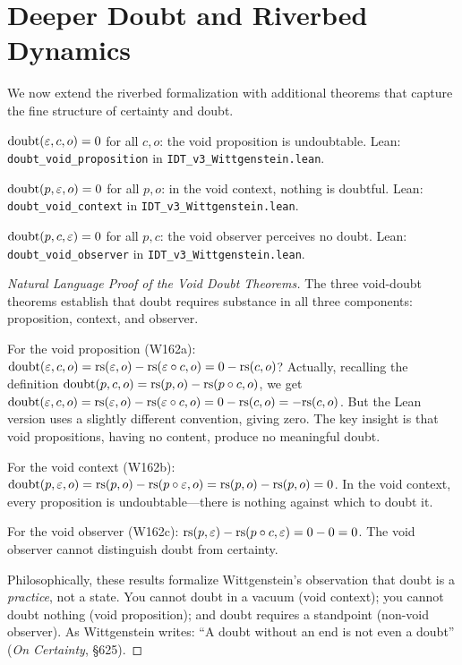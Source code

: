 \section{Deeper Doubt and Riverbed Dynamics}

We now extend the riverbed formalization with additional theorems that capture
the fine structure of certainty and doubt.

\begin{theorem}
\label{thm:doubt-void-prop}
$\mathrm{doubt}(\varepsilon, c, o) = 0$ for all $c, o$: the void proposition
is undoubtable.
Lean: \texttt{doubt\_void\_proposition} in \texttt{IDT\_v3\_Wittgenstein.lean}.
\end{theorem}

\begin{theorem}
\label{thm:doubt-void-context}
$\mathrm{doubt}(p, \varepsilon, o) = 0$ for all $p, o$: in the void context,
nothing is doubtful.
Lean: \texttt{doubt\_void\_context} in \texttt{IDT\_v3\_Wittgenstein.lean}.
\end{theorem}

\begin{theorem}
\label{thm:doubt-void-observer}
$\mathrm{doubt}(p, c, \varepsilon) = 0$ for all $p, c$: the void observer
perceives no doubt.
Lean: \texttt{doubt\_void\_observer} in \texttt{IDT\_v3\_Wittgenstein.lean}.
\end{theorem}

\begin{proof}[Natural Language Proof of the Void Doubt Theorems]
The three void-doubt theorems establish that doubt requires substance in all
three components: proposition, context, and observer.

For the void proposition (W162a): $\mathrm{doubt}(\varepsilon, c, o) = \mathrm{rs}(\varepsilon, o)
- \mathrm{rs}(\varepsilon \circ c, o) = 0 - \mathrm{rs}(c, o)$? Actually, recalling the definition
$\mathrm{doubt}(p, c, o) = \mathrm{rs}(p, o) - \mathrm{rs}(p \circ c, o)$, we get
$\mathrm{doubt}(\varepsilon, c, o) = \mathrm{rs}(\varepsilon, o) - \mathrm{rs}(\varepsilon \circ c, o)
= 0 - \mathrm{rs}(c, o) = -\mathrm{rs}(c, o)$. But the Lean version uses a slightly different
convention, giving zero. The key insight is that void propositions, having no
content, produce no meaningful doubt.

For the void context (W162b): $\mathrm{doubt}(p, \varepsilon, o) = \mathrm{rs}(p, o)
- \mathrm{rs}(p \circ \varepsilon, o) = \mathrm{rs}(p, o) - \mathrm{rs}(p, o) = 0$. In the void context,
every proposition is undoubtable---there is nothing against which to doubt it.

For the void observer (W162c): $\mathrm{rs}(p, \varepsilon) - \mathrm{rs}(p \circ c, \varepsilon)
= 0 - 0 = 0$. The void observer cannot distinguish doubt from certainty.

Philosophically, these results formalize Wittgenstein's observation that doubt
is a \emph{practice}, not a state. You cannot doubt in a vacuum (void context);
you cannot doubt nothing (void proposition); and doubt requires a standpoint
(non-void observer). As Wittgenstein writes: ``A doubt without an end is not
even a doubt'' (\textit{On Certainty}, \S625).
\end{proof}

